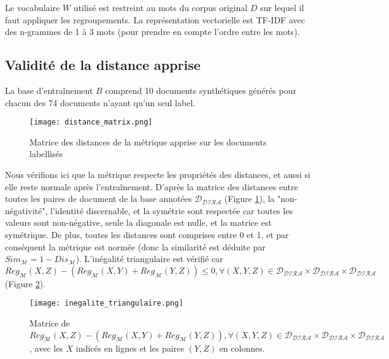 Le vocabulaire $W$ utilisé est restreint au mots du corpus original $D$ sur lequel il faut appliquer les regroupements. La représentation vectorielle est TF-IDF avec des n-grammes de 1 à 3 mots (pour prendre en compte l'ordre entre les mots).

\subsection{Validité de la distance apprise}
La base d'entraînement $B$ comprend 10 documents synthétiques générés pour chacun des 74 documents n'ayant qu'un seul label.
\begin{figure}[!htb]
	\centering \texttt{[image: distance\_matrix.png]}
	\caption{Matrice des distances de la métrique apprise sur les documents labellisés}\label{fig:similarite:distance_matrix}
\end{figure}
Nous vérifions ici que la métrique respecte les propriétés des distances, et aussi si elle reste normale après l'entraînement. D'après la matrice des distances entre toutes les paires de document de la base annotées $\mathcal{D_{\text{DIRA}}}$ (Figure \ref{fig:similarite:distance_matrix}),  la "non-négativité", l'identité discernable, et la symétrie sont respectée car toutes les valeurs sont non-négative, seule la diagonale est nulle, et la matrice est symétrique. De plus, toutes les distances sont comprises entre 0 et 1, et par conséquent la métrique est normée (donc la similarité est déduite par $Sim_\mathcal{M} = 1 - Dis_\mathcal{M}$). L'inégalité triangulaire est vérifié car $Reg_\mathcal{M}(X,Z) - (Reg_\mathcal{M}(X,Y) + Reg_\mathcal{M}(Y,Z)) \leq 0, \forall (X,Y,Z) \in \mathcal{D_{\text{DIRA}}} \times \mathcal{D_{\text{DIRA}}} \times \mathcal{D_{\text{DIRA}}}$ (Figure \ref{fig:similarite:matrice_inegalite_triangulaire}).
\begin{figure}[!htb]
	\centering \texttt{[image: inegalite\_triangulaire.png]}
	\caption{Matrice de $Reg_\mathcal{M}(X,Z) - (Reg_\mathcal{M}(X,Y) + Reg_\mathcal{M}(Y,Z)), \forall (X,Y,Z) \in \mathcal{D_{\text{DIRA}}} \times \mathcal{D_{\text{DIRA}}} \times \mathcal{D_{\text{DIRA}}}$, avec les $X$ indicés en lignes et les paires $(Y,Z)$ en colonnes. }\label{fig:similarite:matrice_inegalite_triangulaire}
\end{figure}


